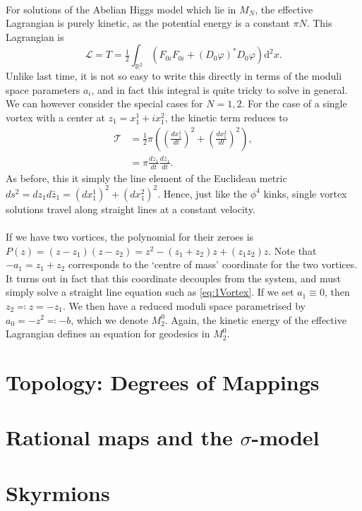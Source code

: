 \documentclass[11pt, fleqn]{article}
\begin{document}
\paragraph{} For solutions of the Abelian Higgs model which lie in $ M_N $, the effective Lagrangian is purely kinetic, as the potential energy is a constant $ \pi N $. This Lagrangian is
	\begin{equation}\label{key}
		\mathscr{L} = T = \tfrac{1}{2} \int_{\mathbb{R}^2}  \left( F_{0i}F_{0i} + \left( D_0 \varphi \right)^* D_0 \varphi \right) \mathrm{d}^2x.
	\end{equation}
Unlike last time, it is not so easy to write this directly in terms of the moduli space parameters $ a_i $, and in fact this integral is quite tricky to solve in general. We can however consider the special cases for $ N = 1,2 $. For the case of a single vortex with a center at $ z_1 = x^1_1 + i x^2_1 $, the kinetic term reduces to
	\begin{align}\label{eq:1Vortex}
		\mathcal{T} &= \frac{1}{2} \pi \left( \left( \frac{dx^1_1}{dt} \right)^2 + \left( \frac{dx^2_1}{dt} \right)^2 \right), \nonumber \\
		&= \pi \frac{dz_1}{dt} \frac{d \bar{z}_1}{dt}.
	\end{align}
As before, this it simply the line element of the Euclidean metric $ ds^2 = dz_1 d\bar{z}_1 = (dx^1_1)^2 + (dx^2_1)^2 $. Hence, just like the $ \phi^4 $ kinks, single vortex solutions travel along straight lines at a constant velocity.

\paragraph{} If we have two vortices, the polynomial for their zeroes is $ P(z) = (z-z_1)(z-z_2) = z^2 - (z_1 + z_2)z + (z_1 z_2)z $. Note that $ - a_1 = z_1 + z_2 $ corresponds to the `centre of mass' coordinate for the two vortices. It turns out in fact that this coordinate decouples from the system, and must simply solve a straight line equation such as \eqref{eq:1Vortex}. If we set $ a_1 \equiv 0 $, then $ z_2 \eqqcolon z = - z_1  $. We then have a reduced moduli space parametrised by $ a_0 = - z^2 \eqqcolon - b $, which we denote $ M^0_2 $. Again, the kinetic energy of the effective Lagrangian defines an equation for geodesics in $ M^0_2 $.

\section{Topology: Degrees of Mappings}

\section{Rational maps and the $ \sigma $-model}

\section{Skyrmions}
\end{document}
